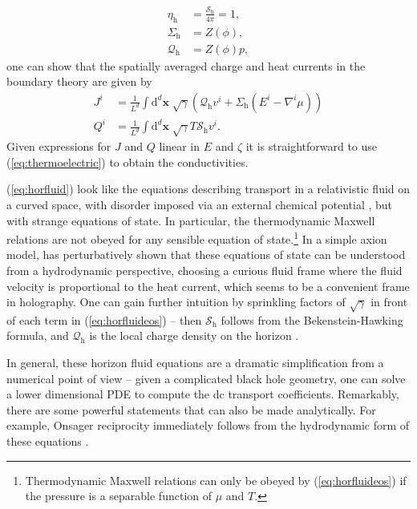 \documentclass[10pt, oneside]{book}
\begin{document}
\begin{doublespace}
\begin{subequations}
\begin{align}
\eta_{\mathrm{h}} &= \frac{\mathcal{S}_{\mathrm{h}}}{4\pi} = 1, \\
\Sigma_{\mathrm{h}} &= Z(\phi), \\
\mathcal{Q}_{\mathrm{h}} &= Z(\phi)p,
\end{align}\end{subequations}
one can show that the spatially averaged charge and heat currents in the boundary theory are given by \begin{subequations}\begin{align}
J^i &= \frac{1}{L^d}\int \mathrm{d}^d\mathbf{x}\; \sqrt{\gamma} \left(\mathcal{Q}_{\mathrm{h}}v^i + \Sigma_{\mathrm{h}} \left(E^i - \nabla^i \mu\right)\right) \\
Q^i &= \frac{1}{L^d}\int \mathrm{d}^d\mathbf{x}\; \sqrt{\gamma} T\mathcal{S}_{\mathrm{h}} v^i.
\end{align}\end{subequations}
Given expressions for $J$ and $Q$ linear in $E$ and $\zeta$ it is straightforward to use (\ref{eq:thermoelectric}) to obtain the conductivities.   

(\ref{eq:horfluid}) look like the equations describing transport in a relativistic fluid on a curved space, with disorder imposed via an external chemical potential \cite{Lucas:2015lna}, but with strange equations of state.   In particular, the thermodynamic Maxwell relations are not obeyed for any sensible equation of state.\footnote{Thermodynamic Maxwell relations can only be obeyed by (\ref{eq:horfluideos}) if the pressure is a separable function of $\mu$ and $T$.}    In a simple axion model, \cite{Blake:2015epa, Blake:2015hxa} has perturbatively shown that these equations of state can be understood from a hydrodynamic perspective, choosing a curious fluid frame where the fluid velocity is proportional to the heat current,  which seems to be a convenient frame in holography.   One can gain further intuition by sprinkling factors of $\sqrt{\gamma}$ in front of each term in (\ref{eq:horfluideos}) -- then $\mathcal{S}_{\mathrm{h}}$ follows from the Bekenstein-Hawking formula, and $\mathcal{Q}_{\mathrm{h}}$ is the local charge density on the horizon \cite{Lucas:2015lna}.

In general, these horizon fluid equations are a dramatic simplification from a numerical point of view -- given a complicated black hole geometry,  one can solve a lower dimensional PDE to compute the dc transport coefficients.   Remarkably, there are some powerful statements that can also be made analytically.   For example, Onsager reciprocity immediately follows from the hydrodynamic form of these equations \cite{Lucas:2015lna}.   


\end{doublespace}
\end{document}
